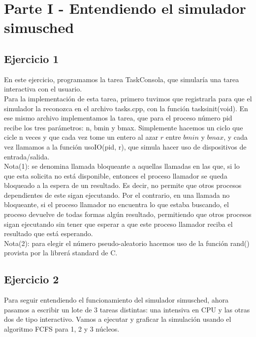 \documentclass[a4paper]{article}
\begin{document}
\section{Parte I - Entendiendo el simulador simusched}

\subsection{Ejercicio 1}
En este ejercicio, programamos la tarea TaskConsola, que simular\'ia una tarea interactiva con
el usuario. \\
Para la implementaci\'on de esta tarea, primero tuvimos que registrarla para que el simulador la 
reconozca en el archivo tasks.cpp, con la funci\'on tasksinit(void). En ese mismo archivo implementamos
la tarea, que para el proceso n\'umero pid recibe los tres par\'ametros: n, bmin y bmax. Simplemente
hacemos un ciclo que cicle n veces y que cada vez tome un entero al azar $r$ entre $bmin$ y 
$bmax$, y cada vez llamamos a la funci\'on usoIO(pid, r), que simula hacer uso de dispositivos de
entrada/salida. \\
Nota(1): se denomina llamada bloqueante a aquellas llamadas en las que, si lo que esta  
solicita no est\'a disponible, entonces el proceso llamador se queda bloqueado a la espera de un
resultado. Es decir, no permite que otros procesos dependientes de este sigan ejecutando. Por 
el contrario, en una llamada no bloqueante, si el proceso llamador no encuentra lo que estaba
buscando, el proceso devuelve de todas formas alg\'un resultado, permitiendo que otros procesos
sigan ejecutando sin tener que esperar a que este proceso llamador reciba el resultado que est\'a
esperando. \\
Nota(2): para elegir el n\'umero pseudo-aleatorio hacemos uso de la funci\'on rand() provista
por la librer\'a standard de C. \\

\subsection{Ejercicio 2}
Para seguir entendiendo el funcionamiento del simulador simusched, ahora pasamos a escribir un lote
de 3 tareas distintas: una intensiva en CPU y las otras dos de tipo interactivo. Vamos a ejecutar y
graficar la simulaci\'on usando el algoritmo FCFS para 1, 2 y 3 n\'ucleos. \\


\end{document}
